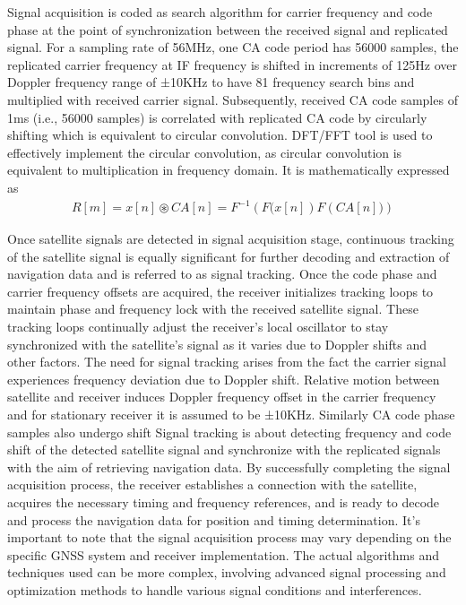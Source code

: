 \documentclass[onecolumn]{article}
\providecommand{\brak}[1]{\ensuremath{\left(#1\right)}}
\begin{document}
\begin{enumerate}
\begin{Large}
Signal acquisition is coded as search algorithm for carrier frequency and code phase at the point of synchronization between the received signal and replicated signal. For a sampling rate of 56MHz, one CA code period has 56000 samples, the replicated carrier frequency at IF frequency is
shifted in increments of 125Hz over Doppler frequency range of ±10KHz to have 81 frequency search bins and multiplied with received carrier signal. Subsequently, received CA code samples of 1ms (i.e., 56000 samples) is correlated with replicated CA code by circularly shifting which is equivalent to circular convolution. 
DFT/FFT tool is used to effectively implement the circular convolution, as circular convolution is equivalent to multiplication in frequency domain. It is mathematically expressed as\\


\begin{align}
R[m]=x[n] \circledast CA[n]=F^{-1}\brak{F(x[n]}F\brak{CA[n])}
\end{align}

Once satellite signals are detected in signal acquisition stage, continuous tracking of the satellite signal is equally significant for further decoding and extraction of navigation data and is referred to as signal tracking. Once the code phase and carrier frequency offsets are acquired, the receiver initializes tracking loops to maintain phase and frequency lock with the received satellite signal. These tracking loops continually adjust the receiver's local oscillator to stay synchronized with the satellite's signal as it varies due to Doppler shifts and other factors. The need for signal tracking arises from the fact the carrier signal experiences frequency deviation due to Doppler shift. Relative motion between satellite and receiver induces Doppler frequency offset in the carrier frequency and for stationary receiver it is assumed to be ±10KHz. Similarly CA code phase samples also undergo shift Signal tracking is about detecting frequency and code shift of the detected satellite signal and synchronize with the replicated signals with the aim of retrieving navigation data.
By successfully completing the signal acquisition process, the receiver establishes a connection with the satellite, acquires the necessary timing and frequency references, and is ready to decode and process the navigation data for position and timing determination.
It's important to note that the signal acquisition process may vary depending on the specific GNSS system and receiver implementation. The actual algorithms and techniques used can be more complex, involving advanced signal processing and optimization methods to handle various signal conditions and interferences.
\end{Large}\\


\end{enumerate}
\end{document}
